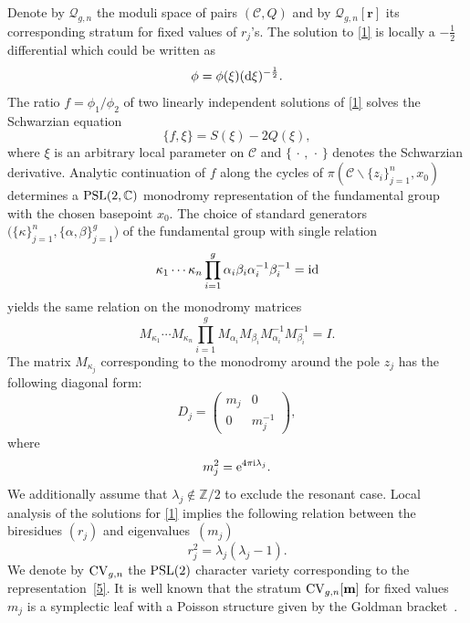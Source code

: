 \documentclass[pdftex]{sigma}
\numberwithin{equation}{section}
\theoremstyle{definition}
\newcommand{\Z}{\mathbb{Z}}
\newcommand{\CC}{\mathbb{C}}
\begin{document}
Denote by $\mathcal{Q}_{g,n}$ the moduli space of pairs $(\mathcal{C},Q)$ and by $\mathcal{Q}_{g,n}[\mathbf{r}]$ its corresponding stratum for fixed values of $r_j$'s. The solution to \eqref{1} is locally a $-\frac{1}{2}$ differential which could be written as
\begin{equation*}%
\phi=\phi(\xi)({\rm d}\xi)^{-\frac{1}{2}}.
\end{equation*}
The ratio $f={\phi_1}/{\phi_2}$ of two
linearly independent solutions of \eqref{1} solves the Schwarzian equation
\begin{equation*}%
\{f,\xi\}=S(\xi)-2Q(\xi),
\end{equation*}
where $\xi$ is an arbitrary local parameter on $\mathcal{C}$ and $\{ \, \cdot \, , \, \cdot \, \}$ denotes the Schwarzian derivative. Analytic continuation of $f$ along the cycles of $\pi(\mathcal{C}\backslash \{ z_i\}^n_{j=1}, x_0)$ determines a ${\rm PSL}(2, \CC)$ monodromy representation of the fundamental group with the chosen basepoint $x_0$. The choice of standard generators $\big(\{\kappa\}^{n}_{j=1},\{\alpha, \beta\}^{g}_{j=1}\big)$ of the fundamental group with single relation
\begin{equation*}%
\kappa_1 \cdots \kappa_n \prod^g_{i=1}\alpha_i \beta_i \alpha_i^{-1} \beta_i^{-1}={\rm id}
\end{equation*} yields the same relation on the monodromy matrices
\begin{equation}\label{5}
M_{\kappa_1}\cdots M_{\kappa_n}\prod^g_{i=1}M_{\alpha_i} M_{\beta_i} M_{\alpha_i}^{-1}M_{\beta_i}^{-1}=I.
\end{equation}
The matrix $M_{\kappa_j}$ corresponding to the monodromy around the pole $z_j$ has the following diagonal form:
\begin{equation*}%
D_j=\begin{pmatrix}m_j & 0 \\ 0 & m_j^{-1} \end{pmatrix},
\end{equation*}
where
\begin{equation}\label{7}
 m_j^2={\rm e}^{4 \pi {\rm i} \lambda_j}.
\end{equation}
We additionally assume that $\lambda_j \notin \Z/2$ to exclude the resonant case.
Local analysis of the solutions for \eqref{1} implies the following relation between the biresidues $(r_j)$ and eigenvalues~$(m_j)$%
\begin{equation}\label{8}{r^2_j}=\lambda_j(\lambda_j-1). \end{equation}
We denote by ${\rm CV}_{g,n}$ the ${\rm PSL}(2)$ character variety corresponding to the representation~\eqref{5}. It is well known that the stratum ${\rm CV}_{g,n}[\mathbf{m}]$ for fixed values $m_j$ is a symplectic leaf with a Poisson structure given by the Goldman bracket~\cite{Goldman_1984}.
\end{document}
